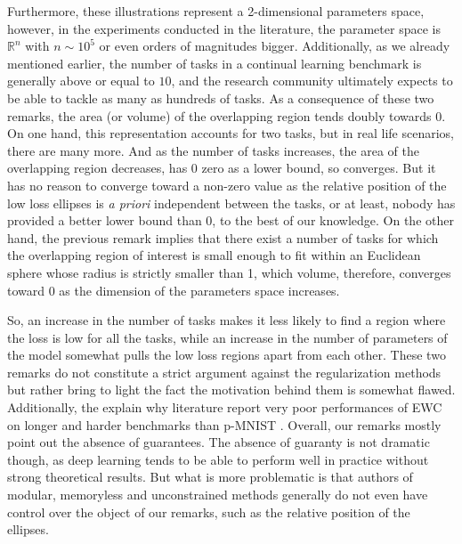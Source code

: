 \documentclass[11pt]{article}
\begin{document}
\vspace{2mm}
\noindent
Furthermore, these illustrations represent a 2-dimensional parameters space, however, in the experiments conducted in the literature, the parameter space is $\mathbb{R}^n$ with $n \sim 10^5$ or even orders of magnitudes bigger. Additionally, as we already mentioned earlier, the number of tasks in a continual learning benchmark is generally above or equal to $10$, and the research community ultimately expects to be able to tackle as many as hundreds of tasks. As a consequence of these two remarks, the area (or volume) of the overlapping region tends doubly towards 0. On one hand, this representation accounts for two tasks, but in real life scenarios, there are many more. And as the number of tasks increases, the area of the overlapping region decreases, has 0 zero as a lower bound, so converges. But it has no reason to converge toward a non-zero value as the relative position of the low loss ellipses is \textit{a priori} independent between the tasks, or at least, nobody has provided a better lower bound than 0, to the best of our knowledge. On the other hand, the previous remark implies that there exist a number of tasks for which the overlapping region of interest is small enough to fit within an Euclidean sphere whose radius is strictly smaller than 1, which volume, therefore, converges toward 0 as the dimension of the parameters space increases. 

\vspace{2mm}
\noindent
So, an increase in the number of tasks makes it less likely to find a region where the loss is low for all the tasks, while an increase in the number of parameters of the model somewhat pulls the low loss regions apart from each other. These two remarks do not constitute a strict argument against the regularization methods but rather bring to light the fact the motivation behind them is somewhat flawed. Additionally, the explain why literature report very poor performances of EWC on longer and harder benchmarks than p-MNIST \cite{EWC_4_ref_romain}\cite{EWC_6_Adversarial_CL}. Overall, our remarks mostly point out the absence of guarantees. The absence of guaranty is not dramatic though, as deep learning tends to be able to perform well in practice without strong theoretical results. But what is more problematic is that authors of modular, memoryless and unconstrained methods generally do not even have control over the object of our remarks, such as the relative position of the ellipses.
\end{document}
